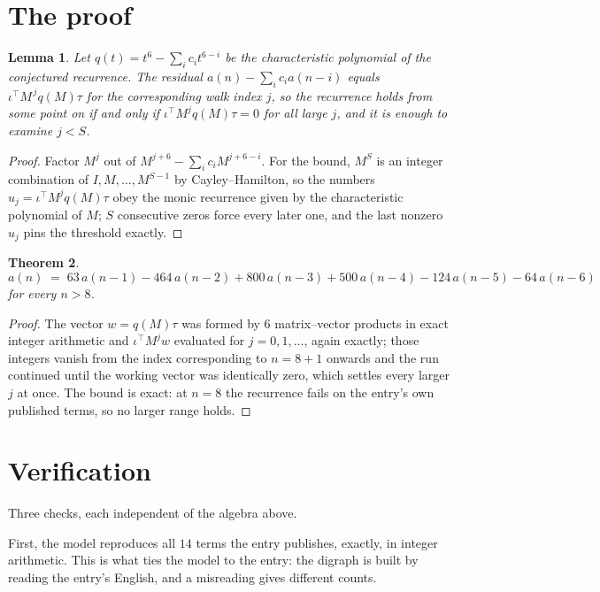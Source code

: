\documentclass[11pt,a4paper]{article}
\theoremstyle{plain}
\newtheorem{theorem}{Theorem}
\newtheorem{lemma}[theorem]{Lemma}
\theoremstyle{definition}
\begin{document}
\section{The proof}

\begin{lemma}\label{lem:crit}
Let $q(t)=t^{6}-\sum_i c_it^{6-i}$ be the characteristic polynomial of the
conjectured recurrence. The residual $a(n)-\sum_ic_ia(n-i)$ equals
$\iota^{\!\top}M^{\,j}q(M)\tau$ for the corresponding walk index $j$, so the recurrence
holds from some point on if and only if $\iota^{\!\top}M^{j}q(M)\tau=0$ for all large $j$,
and it is enough to examine $j<S$.
\end{lemma}

\begin{proof}
Factor $M^{j}$ out of $M^{j+6}-\sum_ic_iM^{j+6-i}$. For the bound, $M^{S}$
is an integer combination of $I,M,\dots,M^{S-1}$ by Cayley--Hamilton, so the numbers
$u_j=\iota^{\!\top}M^{j}q(M)\tau$ obey the monic recurrence given by the characteristic
polynomial of $M$; $S$ consecutive zeros force every later one, and the last nonzero $u_j$
pins the threshold exactly.
\end{proof}

\begin{theorem}
\[
a(n)\;=\;63\,a(n-1) - 464\,a(n-2) + 800\,a(n-3) + 500\,a(n-4) - 124\,a(n-5) - 64\,a(n-6)
\]
for every $n>8$.
\end{theorem}

\begin{proof}
The vector $w=q(M)\tau$ was formed by $6$ matrix--vector products in exact integer
arithmetic and $\iota^{\!\top}M^{j}w$ evaluated for $j=0,1,\dots$, again exactly; those
integers vanish from the index corresponding to $n=8+1$ onwards and the run continued
until the working vector was identically zero, which settles every larger $j$ at once. The bound is exact: at $n=8$ the recurrence fails on the entry's own published terms, so no larger range holds.
\end{proof}

\section{Verification}

Three checks, each independent of the algebra above.

First, the model reproduces all $14$ terms the entry publishes, exactly, in integer
arithmetic. This is what ties the model to the entry: the digraph is built by reading the
entry's English, and a misreading gives different counts.
\end{document}
